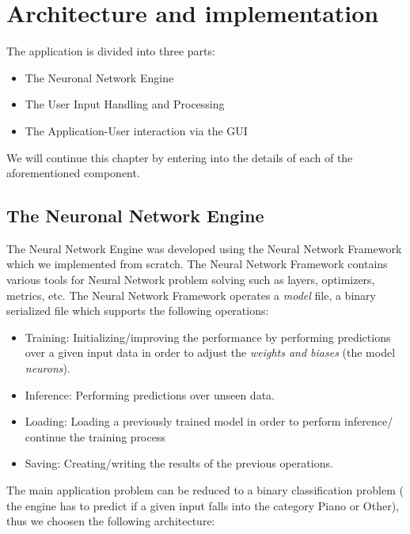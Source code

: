 \chapter{Architecture and implementation}

The application is divided into three parts:
	\begin{itemize}
		\addtolength{\itemindent}{1cm}
		\item The Neuronal Network Engine
		\item The User Input Handling and Processing
		\item The Application-User interaction via the GUI
	\end{itemize}

We will continue this chapter by entering into the details of each of the aforementioned component.

\section{The Neuronal Network Engine}

The Neural Network Engine was developed using the Neural Network Framework which we implemented from scratch. The
Neural Network Framework contains various tools for Neural Network problem solving such as layers, optimizers, metrics,
etc. The Neural Network Framework operates a \textit{model} file, a binary serialized file which supports the following
operations:
	\begin{itemize}
		\item Training: Initializing/improving the performance by performing predictions over a given input
			data in order to adjust the \textit{weights and biases} (the model \textit{neurons}).
		\item Inference: Performing predictions over unseen data.
		\item Loading: Loading a previously trained model in order to perform inference/ continue the training process
		\item Saving: Creating/writing the results of the previous operations.

	\end{itemize}
The main application problem can be reduced to a binary classification problem ( the engine has to predict if a given
input falls into the category Piano or Other), thus we choosen the following architecture:


